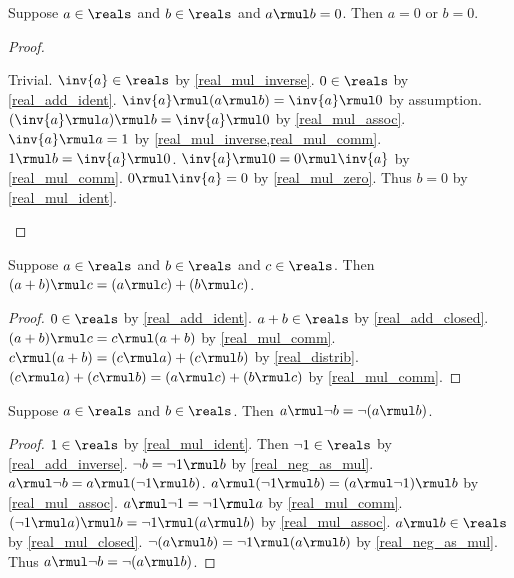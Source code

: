 \begin{theorem}\label{real_mul_zero_product}
    Suppose $a\in\reals$ and $b\in\reals$ and $a \rmul b = 0$.
    Then $a = 0$ or $b = 0$.
\end{theorem}
\begin{proof}
    \begin{byCase}
     Trivial.
        $\inv{a}\in\reals$ by \cref{real_mul_inverse}.
        $0\in\reals$ by \cref{real_add_ident}.
        $\inv{a} \rmul (a \rmul b) = \inv{a} \rmul 0$ by assumption.
        $(\inv{a} \rmul a) \rmul b = \inv{a} \rmul 0$ by \cref{real_mul_assoc}.
        $\inv{a} \rmul a = 1$ by \cref{real_mul_inverse,real_mul_comm}.
        $1 \rmul b = \inv{a} \rmul 0$.
        $\inv{a} \rmul 0 = 0 \rmul \inv{a}$ by \cref{real_mul_comm}.
        $0 \rmul \inv{a} = 0$ by \cref{real_mul_zero}.
        Thus $b = 0$ by \cref{real_mul_ident}.
    \end{byCase}
\end{proof}


\begin{lemma}\label{real_right_distrib}
    Suppose $a\in\reals$ and $b\in\reals$ and $c\in\reals$.
    Then $(a + b) \rmul c = (a \rmul c) + (b \rmul c)$.
\end{lemma}
\begin{proof}
    $0\in\reals$ by \cref{real_add_ident}.
    $a + b\in\reals$ by \cref{real_add_closed}.
    $(a + b) \rmul c = c \rmul (a + b)$ by \cref{real_mul_comm}.
    $c \rmul (a + b) = (c \rmul a) + (c \rmul b)$ by \cref{real_distrib}.
    $(c \rmul a) + (c \rmul b) = (a \rmul c) + (b \rmul c)$ by \cref{real_mul_comm}.
\end{proof}

\begin{lemma}\label{real_mul_neg_right}
    Suppose $a\in\reals$ and $b\in\reals$.
    Then $a \rmul \neg{b} = \neg{(a \rmul b)}$.
\end{lemma}
\begin{proof}
    $1\in\reals$ by \cref{real_mul_ident}.
    Then $\neg{1}\in\reals$ by \cref{real_add_inverse}.
    $\neg{b} = \neg{1} \rmul b$ by \cref{real_neg_as_mul}.
    $a \rmul \neg{b} = a \rmul (\neg{1} \rmul b)$.
    $a \rmul (\neg{1} \rmul b) = (a \rmul \neg{1}) \rmul b$ by \cref{real_mul_assoc}.
    $a \rmul \neg{1} = \neg{1} \rmul a$ by \cref{real_mul_comm}.
    $(\neg{1} \rmul a) \rmul b = \neg{1} \rmul (a \rmul b)$ by \cref{real_mul_assoc}.
    $a \rmul b\in\reals$ by \cref{real_mul_closed}.
    $\neg{(a \rmul b)} = \neg{1} \rmul (a \rmul b)$ by \cref{real_neg_as_mul}.
    Thus $a \rmul \neg{b} = \neg{(a \rmul b)}$.
\end{proof}

